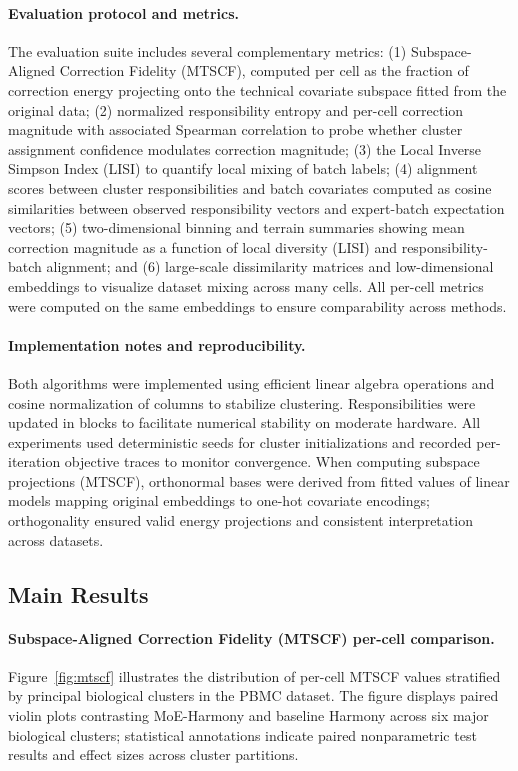 \documentclass{article}
\begin{document}
\paragraph{Evaluation protocol and metrics.} The evaluation suite includes several complementary metrics: (1) Subspace\hyp{}Aligned Correction Fidelity (MTSCF), computed per cell as the fraction of correction energy projecting onto the technical covariate subspace fitted from the original data; (2) normalized responsibility entropy and per\hyp{}cell correction magnitude with associated Spearman correlation to probe whether cluster assignment confidence modulates correction magnitude; (3) the Local Inverse Simpson Index (LISI) to quantify local mixing of batch labels; (4) alignment scores between cluster responsibilities and batch covariates computed as cosine similarities between observed responsibility vectors and expert-batch expectation vectors; (5) two-dimensional binning and terrain summaries showing mean correction magnitude as a function of local diversity (LISI) and responsibility-batch alignment; and (6) large-scale dissimilarity matrices and low-dimensional embeddings to visualize dataset mixing across many cells. All per-cell metrics were computed on the same embeddings to ensure comparability across methods.

\paragraph{Implementation notes and reproducibility.} Both algorithms were implemented using efficient linear algebra operations and cosine normalization of columns to stabilize clustering. Responsibilities were updated in blocks to facilitate numerical stability on moderate hardware. All experiments used deterministic seeds for cluster initializations and recorded per-iteration objective traces to monitor convergence. When computing subspace projections (MTSCF), orthonormal bases were derived from fitted values of linear models mapping original embeddings to one\hyp{}hot covariate encodings; orthogonality ensured valid energy projections and consistent interpretation across datasets.

\subsection{Main Results}

\paragraph{Subspace\hyp{}Aligned Correction Fidelity (MTSCF) per\hyp{}cell comparison.} Figure~\ref{fig:mtscf} illustrates the distribution of per\hyp{}cell MTSCF values stratified by principal biological clusters in the PBMC dataset. The figure displays paired violin plots contrasting MoE-Harmony and baseline Harmony across six major biological clusters; statistical annotations indicate paired nonparametric test results and effect sizes across cluster partitions.
\end{document}
